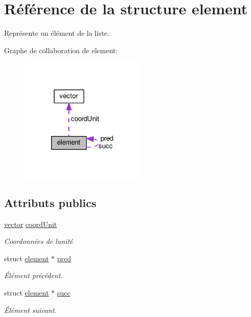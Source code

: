 \hypertarget{structelement}{}\section{Référence de la structure element}
\label{structelement}


Représente un élément de la liste.  




Graphe de collaboration de element\+:\nopagebreak
\begin{figure}[H]
\begin{center}
\leavevmode
\includegraphics[width=171pt]{structelement__coll__graph}
\end{center}
\end{figure}
\subsection*{Attributs publics}
\begin{DoxyCompactItemize}
\item 
\hypertarget{structelement_a8a19f4b42fc45e4a8cfbff2d956e02d3}{}\hyperlink{structvector}{vector} \hyperlink{structelement_a8a19f4b42fc45e4a8cfbff2d956e02d3}{coord\+Unit}\label{structelement_a8a19f4b42fc45e4a8cfbff2d956e02d3}

\begin{DoxyCompactList}\small\item\em Coordonnées de l\textquotesingle{}unité \end{DoxyCompactList}\item 
\hypertarget{structelement_a9f9ebee1fa1dce6d05bc325a66478635}{}struct \hyperlink{structelement}{element} $\ast$ \hyperlink{structelement_a9f9ebee1fa1dce6d05bc325a66478635}{pred}\label{structelement_a9f9ebee1fa1dce6d05bc325a66478635}

\begin{DoxyCompactList}\small\item\em Élément précédent. \end{DoxyCompactList}\item 
\hypertarget{structelement_abe10f441a14a96bd130a004585b475ad}{}struct \hyperlink{structelement}{element} $\ast$ \hyperlink{structelement_abe10f441a14a96bd130a004585b475ad}{succ}\label{structelement_abe10f441a14a96bd130a004585b475ad}

\begin{DoxyCompactList}\small\item\em Élément suivant. \end{DoxyCompactList}\end{DoxyCompactItemize}


